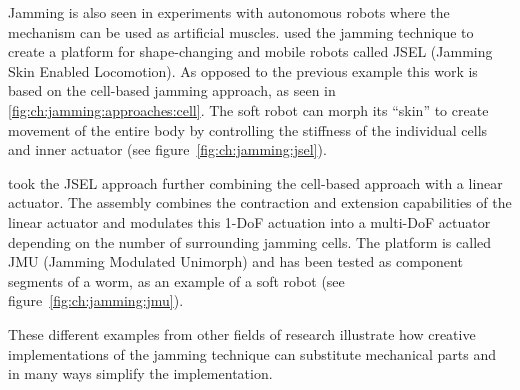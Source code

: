 Jamming is also seen in experiments with autonomous robots where the mechanism can be used as artificial muscles.
\citet{steltz2009jsel} used the jamming technique to create a platform for shape-changing and mobile robots called JSEL (Jamming Skin Enabled Locomotion).
As opposed to the previous example this work is based on the cell-based jamming approach, as seen in \ref{fig:ch:jamming:approaches:cell}.
The soft robot can morph its ``skin'' to create movement of the entire body by controlling the stiffness of the individual cells and inner actuator (see figure~\ref{fig:ch:jamming:jsel}). 

\citet{steltz2010jamming} took the JSEL approach further combining the cell-based approach with a linear actuator. 
The assembly combines the contraction and extension capabilities of the linear actuator and modulates this 1-DoF actuation into a multi-DoF actuator depending on the number of surrounding jamming cells.
The platform is called JMU (Jamming Modulated Unimorph) and has been tested as component segments of a worm, as an example of a soft robot (see figure~\ref{fig:ch:jamming:jmu}).

These different examples from other fields of research illustrate how creative implementations of the jamming technique can substitute mechanical parts and in many ways simplify the implementation.


